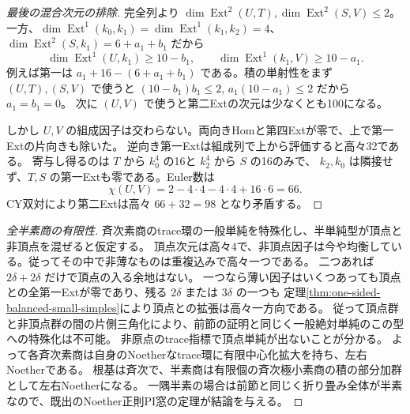 \begin{proof}[最後の混合次元の排除]
完全列より $\dim\operatorname{Ext}^2(U,T),\dim\operatorname{Ext}^2(S,V)\le2$。
一方、$\dim\operatorname{Ext}^1(k_0,k_1)=\dim\operatorname{Ext}^1(k_1,k_2)=4$、
$\dim\operatorname{Ext}^2(S,k_1)=6+a_1+b_1$ だから
\[
   \dim\operatorname{Ext}^1(U,k_1)\ge10-b_1,\qquad
   \dim\operatorname{Ext}^1(k_1,V)\ge10-a_1 .
\]
例えば第一は $a_1+16-(6+a_1+b_1)$ である。積の単射性をまず $(U,T),(S,V)$ で使うと
$(10-b_1)b_1\le2$, $a_1(10-a_1)\le2$ だから $a_1=b_1=0$。
次に $(U,V)$ で使うと第二Extの次元は少なくとも100になる。

しかし $U,V$ の組成因子は交わらない。両向きHomと第四Extが零で、上で第一Extの片向きも除いた。
逆向き第一Extは組成列で上から評価すると高々32である。
寄与し得るのは $T$ から $k_0^4$ の16と $k_2^4$ から $S$ の16のみで、
$k_2,k_0$ は隣接せず、$T,S$ の第一Extも零である。Euler数は
\[
          \chi(U,V)=2-4\cdot4-4\cdot4+16\cdot6=66 .
\]
CY双対により第二Extは高々 $66+32=98$ となり矛盾する。
\end{proof}

\begin{proof}[全半素商の有限性]
斉次素商のtrace環の一般単純を特殊化し、半単純型が頂点と非頂点を混ぜると仮定する。
頂点次元は高々4で、非頂点因子は今や均衡している。従ってその中で非薄なものは重複込みで高々一つである。
二つあれば $2\delta+2\delta$ だけで頂点の入る余地はない。
一つなら薄い因子はいくつあっても頂点との全第一Extが零であり、残る $2\delta$ または $3\delta$ の一つも
定理\ref{thm:one-sided-balanced-small-simples}により頂点との拡張は高々一方向である。
従って頂点群と非頂点群の間の片側三角化により、前節の証明と同じく一般絶対単純のこの型への特殊化は不可能。
非原点のtrace指標で頂点単純が出ないことが分かる。
よって各斉次素商は自身のNoetherなtrace環に有限中心化拡大を持ち、左右Noetherである。
根基は斉次で、半素商は有限個の斉次極小素商の積の部分加群として左右Noetherになる。
一隅半素の場合は前節と同じく折り畳み全体が半素なので、既出のNoether正則PI窓の定理が結論を与える。
\end{proof}
